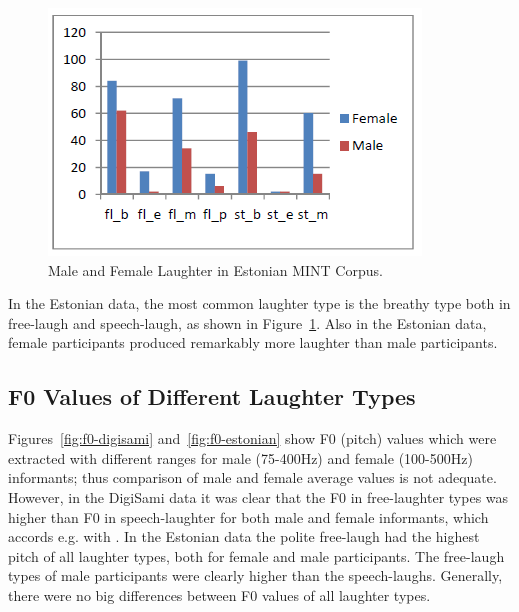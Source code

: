 \documentclass[10pt,journal,compsoc]{IEEEtran}
\begin{document}
\begin{figure}[!t]
\centering
\includegraphics[width=1\linewidth]{images/M-F-MINT.png}
\caption{Male and Female Laughter in Estonian MINT Corpus.}
\label{fig:m-f-estonian}
\end{figure}

In the Estonian data, the most common laughter type is the breathy type both in free-laugh and speech-laugh, as shown in Figure~\ref{fig:m-f-estonian}. Also in the Estonian data, female participants produced remarkably more laughter than male participants.

\subsection{F0 Values of Different Laughter Types}

Figures~\ref{fig:f0-digisami} and~\ref{fig:f0-estonian} show F0 (pitch) values which were extracted with different ranges for male (75-400Hz) and female (100-500Hz) informants; thus comparison of male and female average values is not adequate. However, in the DigiSami data it was clear that the F0 in free-laughter types was higher than F0 in speech-laughter for both male and female informants, which accords e.g. with \cite{Truong:vanLeeuwen:07}. In the Estonian data the polite free-laugh had the highest pitch of all laughter types, both for female and male participants. The free-laugh types of male participants were clearly higher than the speech-laughs. Generally, there were no big differences between F0 values of all laughter types.
\end{document}
